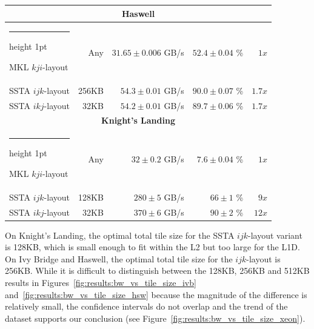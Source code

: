 \documentclass[10pt, conference, compsocconf]{IEEEtran}
\makeatletter
\newcommand{\textapprox}{\texttildelow}
\newcommand{\thickhline}{%
    \noalign {\ifnum 0=`}\fi \hrule height 1pt
    \futurelet \reserved@a \@xhline
}
\makeatother
\begin{document}
\begin{table}[t]
\begin{tabular}{|l|r|r|r|r|}
    \multicolumn{5}{c}{\rule{0pt}{2.25ex} \textbf{Haswell}}           \\ \hline \thickhline
    MKL \(kji\)-layout  &   Any & \(31.65 \pm 0.006\) GB/s & \(52.4 \pm 0.04\) \% & \(1x\)        \\ \hline
    SSTA \(ijk\)-layout & 256KB &   \(54.3 \pm 0.01\) GB/s & \(90.0 \pm 0.07\) \% & \textapprox \(1.7x\) \\ \hline
    SSTA \(ikj\)-layout &  32KB &   \(54.2 \pm 0.01\) GB/s & \(89.7 \pm 0.06\) \% & \textapprox \(1.7x\) \\ \hline

    \multicolumn{5}{c}{\rule{0pt}{2.25ex} \textbf{Knight's Landing}}  \\ \hline \thickhline
    MKL \(kji\)-layout  &   Any & \(32 \pm 0.2\) GB/s &\(7.6 \pm 0.04\) \% & \(1x\)               \\ \hline
    SSTA \(ijk\)-layout & 128KB &  \(280 \pm 5\) GB/s &\(66 \pm 1\) \%     & \textapprox \(9x\)          \\ \hline
    SSTA \(ikj\)-layout &  32KB &  \(370 \pm 6\) GB/s &\(90 \pm 2\) \%     & \textapprox \(12x\)         \\ \hline
  \end{tabular}
\end{table}



On Knight's Landing, the optimal total tile size for the SSTA \(ijk\)-layout
  variant is 128KB, which is small enough to fit within the L2 but too large
  for the L1D. 
On Ivy Bridge and Haswell, the optimal total tile size for the \(ijk\)-layout 
  is 256KB.
While it is difficult to distinguish between the 128KB, 256KB and 512KB results
  in Figures~\ref{fig:results:bw_vs_tile_size_ivb} and~\ref{fig:results:bw_vs_tile_size_hsw}
  because the magnitude of the difference is relatively small, the confidence
  intervals do not overlap and the trend of the dataset supports our conclusion
  (see Figure~\ref{fig:results:bw_vs_tile_size_xeon}).
\end{document}
